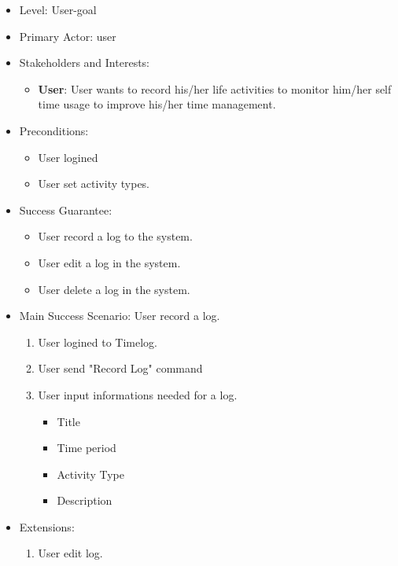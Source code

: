 \documentclass[12pt, a4paper]{article}
\begin{document}
\begin{CJK*}{UTF8}{bkai}
\begin{enumerate}
\begin{itemize}
          \item Level: User-goal
          \item Primary Actor: user
          \item Stakeholders and Interests:
            \begin{itemize}
              \item {\bf User}: User wants to record his/her life activities to monitor him/her self time usage to improve his/her time management.
            \end{itemize}
          \item Preconditions:
            \begin{itemize}
              \item User logined
              \item User set activity types.
            \end{itemize}
          \item Success Guarantee:
            \begin{itemize}
              \item User record a log to the system.
              \item User edit a log in the system.
              \item User delete a log in the system.
            \end{itemize}
          \item Main Success Scenario: User record a log.
            \begin{enumerate}
              \item User logined to Timelog.
              \item User send "Record Log" command
              \item User input informations needed for a log.
                \begin{itemize}
                  \item Title
                  \item Time period
                  \item Activity Type
                  \item Description
                \end{itemize}
            \end{enumerate}
          \item Extensions:
            \begin{enumerate}
              \item User edit log.
                \begin{enumerate}

\end{enumerate}
\end{enumerate}
\end{itemize}
\end{enumerate}
\end{CJK*}
\end{document}
